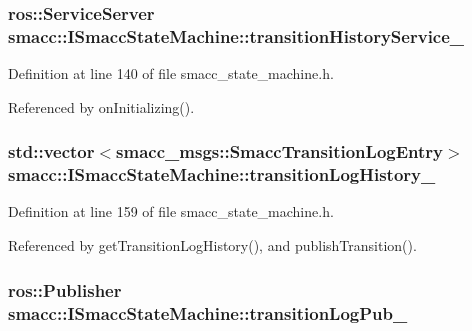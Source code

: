 \subsubsection[{\texorpdfstring{transition\+History\+Service\+\_\+}{transitionHistoryService_}}]{\setlength{\rightskip}{0pt plus 5cm}ros\+::\+Service\+Server smacc\+::\+I\+Smacc\+State\+Machine\+::transition\+History\+Service\+\_\+\hspace{0.3cm}{\ttfamily [protected]}}\hypertarget{classsmacc_1_1ISmaccStateMachine_a73e2a7ca89c3d807eafe5cfb1e86ea05}{}\label{classsmacc_1_1ISmaccStateMachine_a73e2a7ca89c3d807eafe5cfb1e86ea05}


Definition at line 140 of file smacc\+\_\+state\+\_\+machine.\+h.



Referenced by on\+Initializing().

\subsubsection[{\texorpdfstring{transition\+Log\+History\+\_\+}{transitionLogHistory_}}]{\setlength{\rightskip}{0pt plus 5cm}std\+::vector$<$smacc\+\_\+msgs\+::\+Smacc\+Transition\+Log\+Entry$>$ smacc\+::\+I\+Smacc\+State\+Machine\+::transition\+Log\+History\+\_\+\hspace{0.3cm}{\ttfamily [private]}}\hypertarget{classsmacc_1_1ISmaccStateMachine_af682d5fce5bb7c959e2b8814dae50023}{}\label{classsmacc_1_1ISmaccStateMachine_af682d5fce5bb7c959e2b8814dae50023}


Definition at line 159 of file smacc\+\_\+state\+\_\+machine.\+h.



Referenced by get\+Transition\+Log\+History(), and publish\+Transition().

\subsubsection[{\texorpdfstring{transition\+Log\+Pub\+\_\+}{transitionLogPub_}}]{\setlength{\rightskip}{0pt plus 5cm}ros\+::\+Publisher smacc\+::\+I\+Smacc\+State\+Machine\+::transition\+Log\+Pub\+\_\+\hspace{0.3cm}{\ttfamily [protected]}}\hypertarget{classsmacc_1_1ISmaccStateMachine_acc42eb050325c1edc77d81675fb1286a}{}\label{classsmacc_1_1ISmaccStateMachine_acc42eb050325c1edc77d81675fb1286a}


